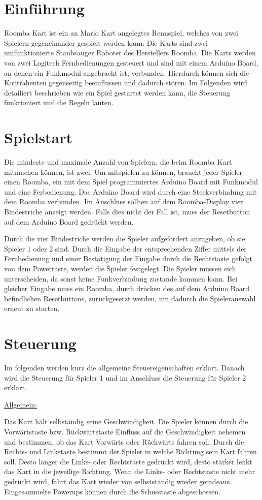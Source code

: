 \section{Einführung}
Roomba Kart ist ein an Mario Kart angelegtes Rennspiel, welches von zwei Spielern gegeneinander gespielt werden kann. Die Karts sind zwei umfunktionierte Staubsauger Roboter des Herstellers Roomba. Die Karts werden von zwei Logitech Fernbedienungen gesteuert und sind mit einem Arduino Board, an denen ein Funkmodul angebracht ist, verbunden. Hierdurch können sich die Kontrahenten gegenseitig beeinflussen und dadurch stören. Im Folgenden wird detailiert beschrieben wie ein Spiel gestartet werden kann, die Steuerung funktioniert und die Regeln lauten. 

\section{Spielstart}
Die mindeste und maximale Anzahl von Spielern, die beim Roomba Kart mitmachen können, ist zwei. Um mitspielen zu können, braucht jeder Spieler einen Roomba, ein mit dem Spiel programmiertes Arduino Board mit Funkmodul und eine Ferbedienung. Das Arduino Board wird durch eine Steckverbindung mit dem Roomba verbunden. Im Anschluss sollten auf dem Roomba-Display vier Bindestriche anzeigt werden. Falls dies nicht der Fall ist, muss der Resetbutton auf dem Arduino Board gedrückt werden.

Durch die vier Bindestriche werden die Spieler aufgefordert anzugeben, ob sie Spieler 1 oder 2 sind. Durch die Eingabe der entsprechenden Ziffer mittels der Fernbedienung und einer Bestätigung der Eingabe durch die Rechtstaste gefolgt von dem Powertaste, werden die Spieler festgelegt. Die Spieler müssen sich unterscheiden, da sonst keine Funkverbindung zustande kommen kann. Bei gleicher Eingabe muss ein Roomba, durch drücken des auf dem Arduino Board befindlichen Resetbuttons, zurückgesetzt werden, um dadurch die Spielerauswahl erneut zu starten. 
   
\section{Steuerung}
Im folgenden werden kurz die allgemeine Steuereigenschaften erklärt. Danach wird die Steuerung für Spieler 1 und im Anschluss die Steuerung für Spieler 2 erklärt. 

\underline{Allgemein:} 

Das Kart hält selbständig seine Geschwindigkeit. Die Spieler können durch die Vorwärtstaste bzw. Rückwärtstaste Einfluss auf die Geschwindigkeit nehemen und bestimmen, ob das Kart Vorwärts oder Rückwärts fahren soll. Durch die Rechts- und Linkstaste bestimmt der Spieler in welche Richtung sein Kart fahren soll. Desto länger die Links- oder Rechtstaste gedrückt wird, desto stärker lenkt das Kart in die jeweilige Richtung. Wenn die Links- oder Rechtstaste nicht mehr gedrückt wird, fährt das Kart wieder von selbstständig wieder geradeaus. Eingesammelte Powerups können durch die Schusstaste abgeschossen.

